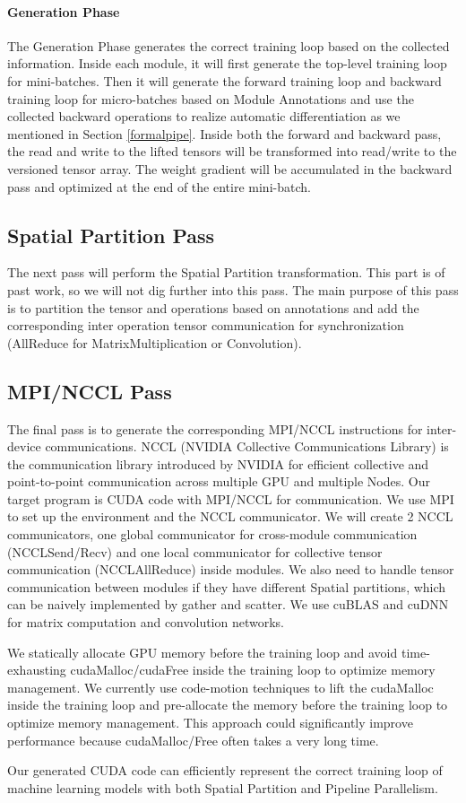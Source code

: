 \documentclass[sigplan, nonacm]{acmart}\settopmatter{printfolios=true,printccs=false,printacmref=false}
\begin{document}
\paragraph{Generation Phase}
The Generation Phase generates the correct training loop based on the collected information. Inside each module, it will first generate the top-level training loop for mini-batches. Then it will generate the forward training loop and backward training loop for micro-batches based on Module Annotations and use the collected backward operations to realize automatic differentiation as we mentioned in Section \ref{formalpipe}. Inside both the forward and backward pass, the read and write to the lifted tensors will be transformed into read/write to the versioned tensor array. The weight gradient will be accumulated in the backward pass and optimized at the end of the entire mini-batch.\par
\subsection{Spatial Partition Pass}
The next pass will perform the Spatial Partition transformation. This part is of past work, so we will not dig further into this pass. The main purpose of this pass is to partition the tensor and operations based on annotations and add the corresponding inter operation tensor communication for synchronization (AllReduce for MatrixMultiplication or Convolution).\par
\subsection{MPI/NCCL Pass}
The final pass is to generate the corresponding MPI/NCCL instructions for inter-device communications. NCCL (NVIDIA Collective Communications Library) is the communication library introduced by NVIDIA for efficient collective and point-to-point communication across multiple GPU and multiple Nodes. Our target program is CUDA code with MPI/NCCL for communication. We use MPI to set up the environment and the NCCL communicator. We will create 2 NCCL communicators, one global communicator for cross-module communication (NCCLSend/Recv) and one local communicator for collective tensor communication (NCCLAllReduce) inside modules. We also need to handle tensor communication between modules if they have different Spatial partitions, which can be naively implemented by gather and scatter. We use cuBLAS and cuDNN for matrix computation and convolution networks.\par
We statically allocate GPU memory before the training loop and avoid time-exhausting cudaMalloc/cudaFree inside the training loop to optimize memory management. We currently use code-motion techniques to lift the cudaMalloc inside the training loop and pre-allocate the memory before the training loop to optimize memory management. This approach could significantly improve performance because cudaMalloc/Free often takes a very long time.\par
Our generated CUDA code can efficiently represent the correct training loop of machine learning models with both Spatial Partition and Pipeline Parallelism.
\end{document}

